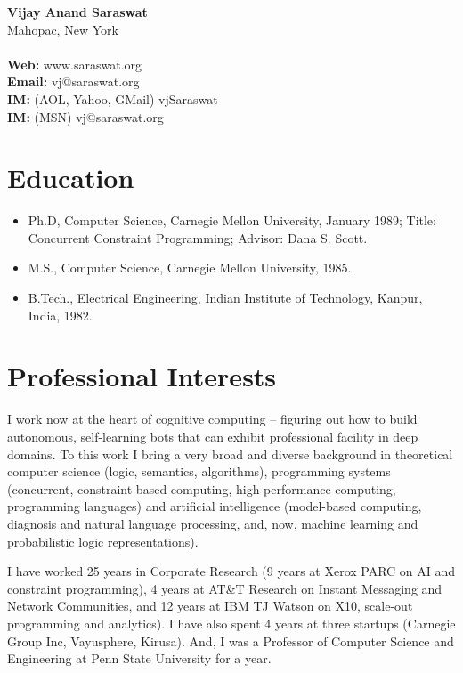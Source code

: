 \documentclass{article}
\begin{document}

\begin{center}
{\bf \sc Vijay Anand Saraswat}\\
Mahopac, New York\\
\quad\\
\textbf{Web:} www.saraswat.org\\
\textbf{Email:} vj@saraswat.org\\
\textbf{IM:} (AOL, Yahoo, GMail) vjSaraswat\\
\textbf{IM:} (MSN) vj@saraswat.org\\
\end{center}

\section*{Education}
\begin{itemize}
\item Ph.D, Computer Science, Carnegie Mellon University, January 1989;
   Title: Concurrent Constraint Programming;
   Advisor: Dana S. Scott.

\item M.S., Computer Science, Carnegie Mellon University, 1985.

\item B.Tech., Electrical Engineering, Indian Institute of Technology,
   Kanpur, India, 1982.
\end{itemize}

\section*{Professional Interests}

I work now at the heart of cognitive computing -- figuring out how to
build autonomous, self-learning bots that can exhibit professional
facility in deep domains. To this work I bring a very broad and
diverse background in theoretical computer science (logic, semantics,
algorithms), programming systems (concurrent, constraint-based
computing, high-performance computing, programming languages) and
artificial intelligence (model-based computing, diagnosis and natural
language processing, and, now, machine learning and probabilistic
logic representations).   

I have worked 25 years in Corporate Research (9 years at Xerox PARC on
AI and constraint programming), 4 years at AT\&T Research on Instant
Messaging and Network Communities, and 12 years at IBM TJ Watson on
X10, scale-out programming and analytics). I have also spent 4 years
at three startups (Carnegie Group Inc, Vayusphere, Kirusa). And, I was a
Professor of Computer Science and Engineering at Penn State University
for a year.  
\end{document}

